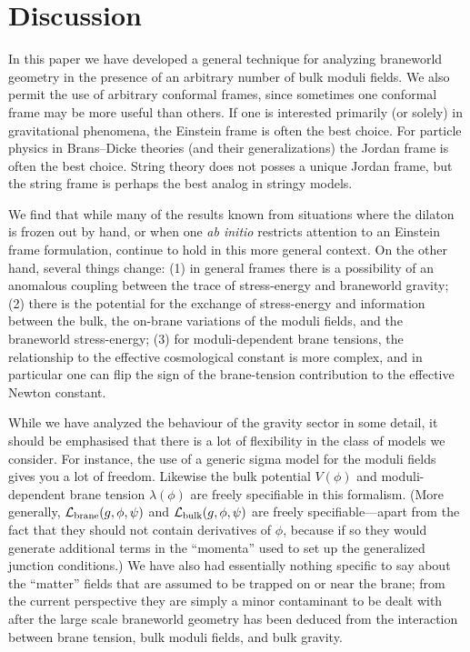 \documentclass[a4paper,10pt]{article}
\begin{document}
{%
\section{Discussion}
\label{S:discussion}
\setcounter{equation}{0}

In this paper we have developed a general technique for analyzing
braneworld geometry in the presence of an arbitrary number of bulk
moduli fields. We also permit the use of arbitrary conformal frames,
since sometimes one conformal frame may be more useful than others. If
one is interested primarily (or solely) in gravitational phenomena,
the Einstein frame is often the best choice. For particle physics in
Brans--Dicke theories (and their generalizations) the Jordan frame is
often the best choice. String theory does not posses a unique Jordan
frame, but the string frame is perhaps the best analog in stringy
models.

We find that while many of the results known from situations where the
dilaton is frozen out by hand, or when one {\emph{ab initio}}
restricts attention to an Einstein frame formulation, continue to
hold in this more general context. On the other hand, several things
change: (1) in general frames there is a possibility of an anomalous
coupling between the trace of stress-energy and braneworld gravity;
(2) there is the potential for the exchange of stress-energy and
information between the bulk, the on-brane variations of the moduli
fields, and the braneworld stress-energy; (3) for moduli-dependent
brane tensions, the relationship to the effective cosmological
constant is more complex, and in particular one can flip the sign of
the brane-tension contribution to the effective Newton constant.

While we have analyzed the behaviour of the gravity sector in some
detail, it should be emphasised that there is a lot of flexibility in
the class of models we consider. For instance, the use of a generic
sigma model for the moduli fields gives you a lot of freedom. Likewise
the bulk potential $V(\phi)$ and moduli-dependent brane tension
$\lambda(\phi)$ are freely specifiable in this formalism. (More
generally, ${\mathcal L}_{\mathrm{brane}}(g,\phi,\psi)$ and ${\mathcal L}_{\mathrm{bulk}}(g,\phi,\psi)$ are
freely specifiable---apart from the fact that they should not contain
derivatives of $\phi$, because if so they would generate additional
terms in the ``momenta'' used to set up the generalized junction
conditions.) We have also had essentially nothing specific to say
about the ``matter'' fields that are assumed to be trapped on or near
the brane; from the current perspective they are simply a minor
contaminant to be dealt with after the large scale braneworld geometry
has been deduced from the interaction between brane tension, bulk
moduli fields, and bulk gravity.

}
\end{document}
